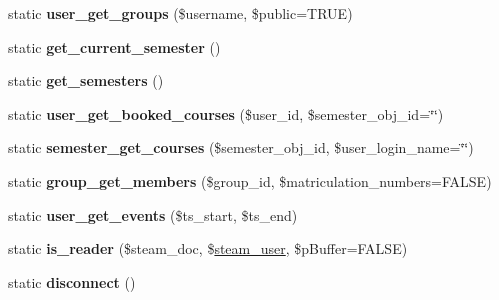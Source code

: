\begin{DoxyCompactItemize}
\item 
\hypertarget{classlms__steam_a19dc2527d71de9dfb2d2a3ee76348890}{
static {\bfseries user\_\-get\_\-groups} (\$username, \$public=TRUE)}
\label{classlms__steam_a19dc2527d71de9dfb2d2a3ee76348890}

\item 
\hypertarget{classlms__steam_a0ab887d0a9fdd4bbb5be05040f64a847}{
static {\bfseries get\_\-current\_\-semester} ()}
\label{classlms__steam_a0ab887d0a9fdd4bbb5be05040f64a847}

\item 
\hypertarget{classlms__steam_a77c8e35b1d8f7d5b5260e839ce6df3fb}{
static {\bfseries get\_\-semesters} ()}
\label{classlms__steam_a77c8e35b1d8f7d5b5260e839ce6df3fb}

\item 
\hypertarget{classlms__steam_a4e470086a8a387bae0dde13c9923f47a}{
static {\bfseries user\_\-get\_\-booked\_\-courses} (\$user\_\-id, \$semester\_\-obj\_\-id=\char`\"{}\char`\"{})}
\label{classlms__steam_a4e470086a8a387bae0dde13c9923f47a}

\item 
\hypertarget{classlms__steam_a4a57163396f6392f53d547debd7f65aa}{
static {\bfseries semester\_\-get\_\-courses} (\$semester\_\-obj\_\-id, \$user\_\-login\_\-name=\char`\"{}\char`\"{})}
\label{classlms__steam_a4a57163396f6392f53d547debd7f65aa}

\item 
\hypertarget{classlms__steam_a35f78244d9b2fe410bcca42a7f8a6d4c}{
static {\bfseries group\_\-get\_\-members} (\$group\_\-id, \$matriculation\_\-numbers=FALSE)}
\label{classlms__steam_a35f78244d9b2fe410bcca42a7f8a6d4c}

\item 
\hypertarget{classlms__steam_ab33703af9f4d46be4195eb0d7c69cfce}{
static {\bfseries user\_\-get\_\-events} (\$ts\_\-start, \$ts\_\-end)}
\label{classlms__steam_ab33703af9f4d46be4195eb0d7c69cfce}

\item 
\hypertarget{classlms__steam_aee8ccaf9ee3d912897dac4de7ca2c5a1}{
static {\bfseries is\_\-reader} (\$steam\_\-doc, \$\hyperlink{classsteam__user}{steam\_\-user}, \$pBuffer=FALSE)}
\label{classlms__steam_aee8ccaf9ee3d912897dac4de7ca2c5a1}

\item 
\hypertarget{classlms__steam_a9cc93dd87a99aa02060e102f4212509a}{
static {\bfseries disconnect} ()}
\label{classlms__steam_a9cc93dd87a99aa02060e102f4212509a}

\end{DoxyCompactItemize}


